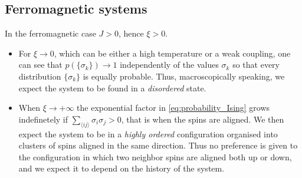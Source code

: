 \subsection{Ferromagnetic systems}
\label{subsec:ferromagnetic}
In the ferromagnetic case $J > 0$, hence $\xi > 0$. 
\begin{itemize}
    \item For $\xi \to 0$, which can be either a high temperature or a weak coupling, one can see that 
    $p(\{\sigma_k\}) \to 1$ independently of the values $\sigma_k$ so that every distribution $\{\sigma_k\}$ is equally probable. 
    Thus, macroscopically speaking, we expect the system to be found in a \emph{disordered} state.
    \item When $\xi \to +\infty$ the exponential factor in \ref{eq:probability_Ising} grows indefinetely if $\sum_{\langle i j\rangle}\sigma_{i} \sigma_{j} > 0$, that is when the spins are aligned.
    We then expect the system to be in a \emph{highly ordered} configuration organised into clusters of spins aligned in the same direction.
    Thus no preference is given to the configuration in which two neighbor spins are aligned both up or down, and we expect it to depend on the history of the system. \\
\end{itemize}
